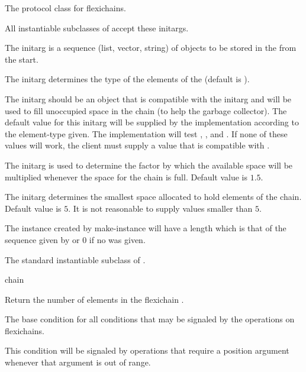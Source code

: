\documentclass[11pt]{article}
\begin{document}
The protocol class for flexichains.


All instantiable subclasses of  accept these
initargs.

The  initarg is a sequence (list, vector,
string) of objects to be stored in the  from the start.

The  initarg determines the type of the elements of
the  (default is ).

The  initarg should be an object that is compatible
with the  initarg and will be used to fill
unoccupied space in the chain (to help the garbage
collector).  The default value for this initarg will be supplied by
the implementation according to the element-type given.  The
implementation will test , , and .
If none of these values will work, the client must supply a value that
is compatible with .

The  initarg is used to determine the factor by
which the available space will be multiplied whenever the space for
the chain is full.  Default value is $1.5$.

The  initarg determines the smallest space allocated to
hold elements of the chain.  Default value is $5$.  It is not
reasonable to supply values smaller than $5$.

The instance created by make-instance will have a length which is that
of the sequence given by  or $0$ if no
 was given.


The standard instantiable subclass of .

 {chain}

Return the number of elements in the flexichain .


The base condition for all conditions that may be signaled by the
operations on flexichains.


This condition will be signaled by operations that require a position
argument whenever that argument is out of range.
\end{document}
